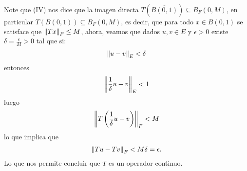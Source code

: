 \begin{homeworkProblem}
\begin{solution}
\begin{itemize}
        Note que (IV) nos dice que la imagen directa $T\left( \overline{B(0,1)} \right)\subseteq B_{F}(0,M)$, en particular $T\left( B(0,1) \right)\subseteq B_{F}(0,M)$, es decir, que para todo $x\in B(0,1)$ se satisface que $\left\|Tx\right\|_{F}\leq M$, ahora, veamos que dados $u,v\in E$ y $\epsilon>0$ existe $\delta=\frac{\epsilon}{M}>0$ tal que si:
        \begin{align*}
          \left\|u-v\right\|_{E}<\delta
        \end{align*}
        entonces
        \begin{align*}
          \left\|\frac{1}{\delta}u-v\right\|_{E}<1
        \end{align*}
        luego
        \begin{align*}
          \left\|T\left( \frac{1}{\delta}u-v \right)\right\|_{F}<M
        \end{align*}
        lo que implica que
        \begin{align*}
          \left\|Tu-Tv\right\|_{F}<M\delta=\epsilon.
        \end{align*}
        Lo que nos permite concluir que $T$ es un operador continuo. 
    \end{itemize}
  \end{solution}
\end{homeworkProblem}

